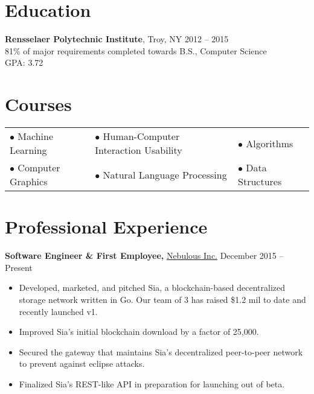 \documentclass[margin]{res}
\begin{document}
\begin{minipage}{\textwidth}


\begin{resume}

\section{Education}
{\bf Rensselaer Polytechnic Institute}, Troy, NY \hfill 2012 -- 2015 \\
81\% of major requirements completed towards B.S., Computer Science \\
GPA: 3.72

\section{Courses}
\begin{tabular}{lll}
$\bullet$ Machine Learning & $\bullet$ Human-Computer Interaction Usability & $\bullet$ Algorithms \\
$\bullet$ Computer Graphics & $\bullet$ Natural Language Processing & $\bullet$ Data Structures \\
\end{tabular}

\section{Professional Experience}
{\bf Software Engineer \& First Employee,} \uline{Nebulous Inc.} \hfill December 2015 -- Present
 \begin{itemize} \itemsep -2pt %
 \item Developed, marketed, and pitched Sia, a blockchain-based decentralized storage network written in Go. Our team of 3 has raised \$1.2 mil to date and recently launched v1.
 \item Improved Sia's initial blockchain download by a factor of 25,000.
 \item Secured the gateway that maintains Sia's decentralized peer-to-peer network to prevent against eclipse attacks.
 \item Finalized Sia's REST-like API in preparation for launching out of beta.
 \end{itemize}




\end{resume}
\end{minipage}
\end{document}
